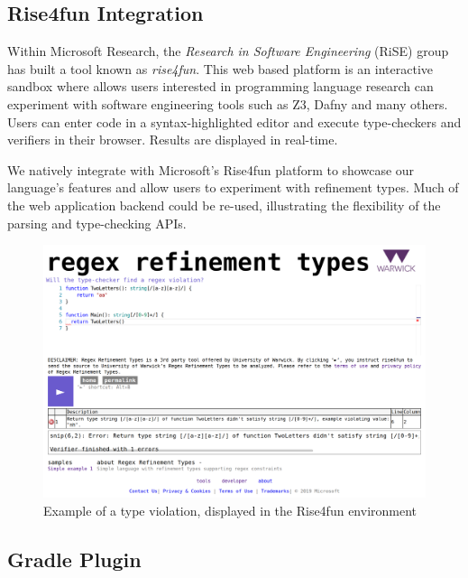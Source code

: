 \documentclass[a4paper,openany,12pt]{book}
\begin{document}
\subsection{Rise4fun Integration}

Within Microsoft Research, the \emph{Research in Software Engineering} (RiSE) group has built a tool known as
\emph{rise4fun}.
This web based platform is an interactive sandbox where allows users interested in programming language research can
experiment with software engineering tools such as Z3, Dafny and many others.
Users can enter code in a syntax-highlighted editor and execute type-checkers and verifiers in their browser.
Results are displayed in real-time.

We natively integrate with Microsoft's Rise4fun platform to showcase our language's features and allow users to
experiment with refinement types.
Much of the web application backend could be re-used, illustrating the flexibility of the parsing and type-checking
APIs.

\begin{figure}[H]
    \begin{MyMdframed}
        \vspace{0.5em}


        \caption{\label{figure:r4f}Example of a type violation, displayed in the Rise4fun environment}
        \vspace{0.5em}
        \captionsetup{style=default}

        \centering \includegraphics[width=0.9\linewidth]{rise4fun.png}
    \end{MyMdframed}
\end{figure}

\subsection{Gradle Plugin}
\end{document}
